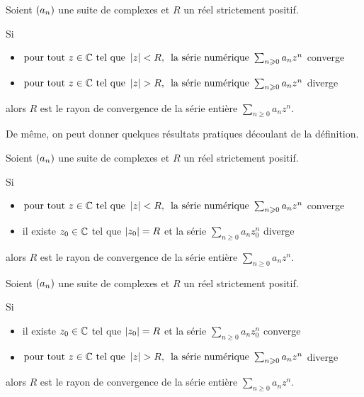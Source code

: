 \begin{prop}
Soient \(\left(a_n\right)\) une suite de complexes et \(R\) un réel strictement positif.

Si

\begin{itemize}
    \item \(\quantifs{\tpt z\in\C\text{ tel que }\abs{z}<R}\text{la série numérique }\sum_{n\geq0}a_nz^n\) converge \\
    \item \(\quantifs{\tpt z\in\C\text{ tel que }\abs{z}>R}\text{la série numérique }\sum_{n\geq0}a_nz^n\) diverge
\end{itemize}

alors \(R\) est le rayon de convergence de la série entière \(\sum_{n\geq0}a_nz^n\).
\end{prop}

De même, on peut donner quelques résultats pratiques découlant de la définition.

\begin{prop}
Soient \(\left(a_n\right)\) une suite de complexes et \(R\) un réel strictement positif.

Si

\begin{itemize}
    \item \(\quantifs{\tpt z\in\C\text{ tel que }\abs{z}<R}\text{la série numérique }\sum_{n\geq0}a_nz^n\) converge \\
    \item il existe \(z_0\in\mathbb{C}\) tel que \(\left\lvert z_0\right\rvert=R\) et la série \(\sum_{n\geq0}a_nz_0^n\) diverge
\end{itemize}

alors \(R\) est le rayon de convergence de la série entière \(\sum_{n\geq0}a_nz^n\).
\end{prop}

\begin{prop}
Soient \(\left(a_n\right)\) une suite de complexes et \(R\) un réel strictement positif.

Si

\begin{itemize}
    \item il existe \(z_0\in\mathbb{C}\) tel que \(\left\lvert z_0\right\rvert=R\) et la série \(\sum_{n\geq0}a_nz_0^n\) converge \\
    \item \(\quantifs{\tpt z\in\C\text{ tel que }\abs{z}>R}\text{la série numérique }\sum_{n\geq0}a_nz^n\) diverge \\
\end{itemize}

alors \(R\) est le rayon de convergence de la série entière \(\sum_{n\geq0}a_nz^n\).
\end{prop}

